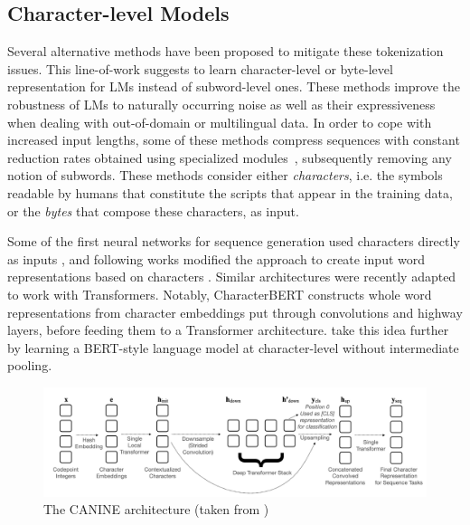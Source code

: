 \subsection{Character-level Models}
\label{sec:tokfree}
Several alternative methods have been proposed to mitigate these tokenization issues.
This line-of-work suggests to learn character-level or byte-level representation for LMs instead of subword-level ones. These methods improve the robustness of LMs to naturally occurring noise as well as their expressiveness when dealing with out-of-domain or multilingual data. In order to cope with increased input lengths, some of these methods compress sequences with constant reduction rates obtained using specialized modules~\cite{clark2022canine,tay2021charformer}, subsequently removing any notion of subwords. These methods consider either \textit{characters}, i.e. the symbols readable by humans that constitute the scripts that appear in the training data, or the \textit{bytes} that compose these characters, as input.

Some of the first neural networks for sequence generation used characters directly as inputs \citep{sutskever2011generating,graves2013generating}, and following works modified the approach to create input word representations based on characters \citep{kim2016character,Jzefowicz2016ExploringTL,peters-etal-2018-deep}. Similar architectures were recently adapted to work with Transformers. Notably, CharacterBERT \citep{el-boukkouri-etal-2020-characterbert} constructs whole word representations from character embeddings put through convolutions and highway layers, before feeding them to a Transformer architecture. \citet{ma-etal-2020-charbert} take this idea further by learning a BERT-style language model at character-level without intermediate pooling. 

\begin{figure}[ht]
    \centering
    \includegraphics[width=0.8\linewidth]{sources/related_works/imgs/canine.png}
    \caption{The CANINE architecture (taken from \citet{clark-etal-2022-canine})}
    \label{fig:canine}
\end{figure}

